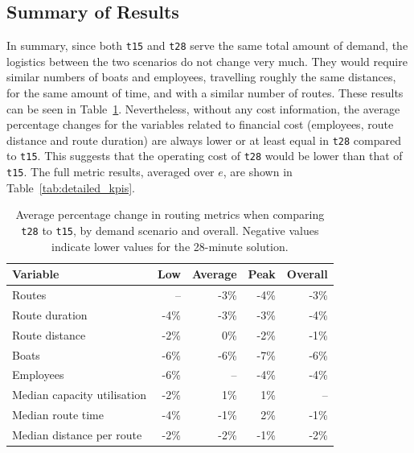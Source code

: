 \documentclass[12pt]{article}
\begin{document}
\subsection{Summary of Results}
\label{subsec:results-summary}

In summary, since both \texttt{t15} and \texttt{t28} serve the same total amount of demand, the logistics between the two scenarios do not change very much. They would require similar numbers of boats and employees, travelling roughly the same distances, for the same amount of time, and with a similar number of routes. These results can be seen in Table~\ref{tab:results-sum}. Nevertheless, without any cost information, the average percentage changes for the variables related to financial cost (employees, route distance and route duration) are always lower or at least equal in \texttt{t28} compared to \texttt{t15}. This suggests that the operating cost of \texttt{t28} would be lower than that of \texttt{t15}. The full metric results, averaged over \(e\), are shown in Table~\ref{tab:detailed_kpis}.

\begin{table}[htbp]
  \centering
  \caption{Average percentage change in routing metrics when comparing \texttt{t28} to \texttt{t15}, by demand scenario and overall. Negative values indicate lower values for the 28-minute solution.}
  \label{tab:results-sum}

  \begin{tabular}{l|rrrr}
    \toprule
    \textbf{Variable}           & \textbf{Low} & \textbf{Average} & \textbf{Peak} & \textbf{Overall} \\
    \midrule
    Routes                      & --           & -3\%             & -4\%          & -3\%             \\
    Route duration              & -4\%         & -3\%             & -3\%          & -4\%             \\
    Route distance              & -2\%         & 0\%              & -2\%          & -1\%             \\
    Boats                       & -6\%         & -6\%             & -7\%          & -6\%             \\
    Employees                   & -6\%         & --               & -4\%          & -4\%             \\
    Median capacity utilisation & -2\%         & 1\%              & 1\%           & --               \\
    Median route time           & -4\%         & -1\%             & 2\%           & -1\%             \\
    Median distance per route   & -2\%         & -2\%             & -1\%          & -2\%             \\
    \bottomrule
  \end{tabular}
\end{table}
\end{document}
